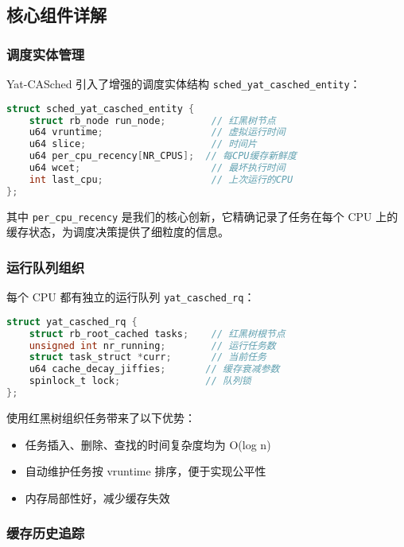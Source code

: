 \subsection{核心组件详解}

\subsubsection{调度实体管理}

Yat-CASched 引入了增强的调度实体结构 \texttt{sched\_yat\_casched\_entity}：

\begin{lstlisting}[language=C, caption=调度实体结构定义]
struct sched_yat_casched_entity {
    struct rb_node run_node;        // 红黑树节点
    u64 vruntime;                   // 虚拟运行时间
    u64 slice;                      // 时间片
    u64 per_cpu_recency[NR_CPUS];  // 每CPU缓存新鲜度
    u64 wcet;                       // 最坏执行时间
    int last_cpu;                   // 上次运行的CPU
};
\end{lstlisting}

其中 \texttt{per\_cpu\_recency} 是我们的核心创新，它精确记录了任务在每个 CPU 上的缓存状态，为调度决策提供了细粒度的信息。

\subsubsection{运行队列组织}

每个 CPU 都有独立的运行队列 \texttt{yat\_casched\_rq}：

\begin{lstlisting}[language=C, caption=运行队列结构]
struct yat_casched_rq {
    struct rb_root_cached tasks;    // 红黑树根节点
    unsigned int nr_running;        // 运行任务数
    struct task_struct *curr;       // 当前任务
    u64 cache_decay_jiffies;       // 缓存衰减参数
    spinlock_t lock;               // 队列锁
};
\end{lstlisting}

使用红黑树组织任务带来了以下优势：
\begin{itemize}
    \item 任务插入、删除、查找的时间复杂度均为 O(log n)
    \item 自动维护任务按 vruntime 排序，便于实现公平性
    \item 内存局部性好，减少缓存失效
\end{itemize}

\subsubsection{缓存历史追踪}

